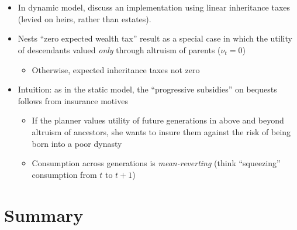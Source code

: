 \documentclass[11pt]{article}
\begin{document}
\section{\cite{farhi2010progressive}}
\begin{itemize}
    \item In dynamic model, \cite{farhi2010progressive} discuss an implementation using linear inheritance taxes (levied on heirs, rather than estates). 
    \item Nests \cite{kocherlakota2005zero} ``zero expected wealth tax'' result as a special case in which the utility of descendants valued \textit{only} through altruism of parents (\( \nu_t = 0 \))
    \begin{itemize}
        \item Otherwise, expected inheritance taxes not zero 
    \end{itemize}
    \item Intuition: as in the static model, the ``progressive subsidies'' on bequests follows from insurance motives 
    \begin{itemize}
        \item If the planner values utility of future generations in above and beyond altruism of ancestors, she wants to insure them against the risk of being born into a poor dynasty 
        \item Consumption across generations is \textit{mean-reverting} (think ``squeezing'' consumption from \( t \) to \( t+1 \))
    \end{itemize}
\end{itemize}

\section{Summary}
\end{document}
